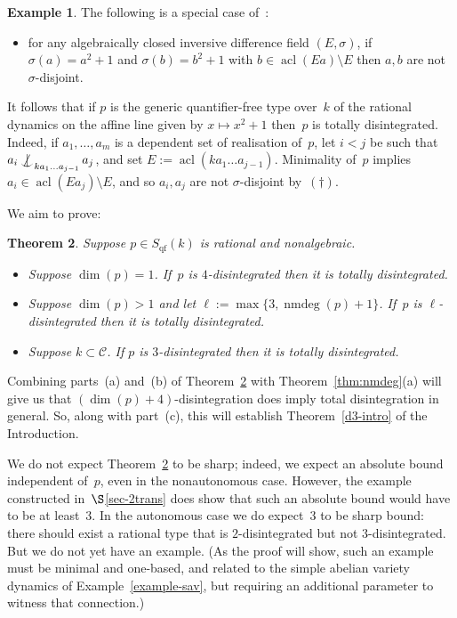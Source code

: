 \documentclass[\DocOpts]{amsart}
\newtheorem{theorem}{Theorem}[section]
\theoremstyle{definition}
\newtheorem{example}[theorem]{Example}
\def\qf{\operatorname{qf}}
\def\acl{\operatorname{acl}}
\def\nmdeg{\operatorname{nmdeg}}
\def\C{\mathcal{C}}
\newcommand{\<}{\langle}
\renewcommand{\>}{\rangle}
\def\notind#1#2{#1\setbox0=\hbox{\(#1x\)}\kern\wd0\hbox to 
0pt{\mathchardef\nn=12854\hss\(#1\nn\)\kern1.4\wd0\hss}\hbox to 
0pt{\hss\(#1\mid\)\hss}\lower.9\ht0 \hbox to 
0pt{\hss\(#1\smile\)\hss}\kern\wd0}
\def\nind{\mathop{\mathpalette\notind{}}}
\begin{document}
\begin{example}
The following is a special case of~\cite[Lemma~6.1]{acfa}:
\begin{itemize}
\item[$(\dagger)$]
for any algebraically closed inversive difference field $(E,\sigma)$, 
if $\sigma(a)=a^2+1$ and $\sigma(b)=b^2+1$ with $b\in\acl(Ea)\setminus E$ then $a,b$ are not $\sigma$-disjoint.
\end{itemize}
It follows that if $p$ is the generic quantifier-free type over~$k$ of the rational dynamics on the affine line given by 
$x\mapsto x^2+1$ then~$p$ is totally disintegrated.
Indeed, if $a_1,\dots,a_m$ is a dependent set of realisation of~$p$, let $i<j$ be such that $a_i\nind_{ka_1\dots a_{j-1}}a_j$, and set $E:=\acl(ka_1\dots a_{j-1})$.
Minimality of~$p$ implies  $a_i\in\acl(Ea_j)\setminus E$, and so $a_i,a_{j}$ are not $\sigma$-disjoint by~$(\dagger)$.
\end{example}

We aim to prove:

\begin{theorem}\label{d3}
Suppose $p\in S_{\qf}(k)$ is rational and nonalgebraic.
\begin{itemize}
\item[(a)]
Suppose $\dim(p)=1$.
If~$p$ is $4$-disintegrated then it is totally disintegrated.
\item[(b)]
 Suppose $\dim(p)>1$ and let
$\ell:=\max\{3, \nmdeg(p)+1\}$.
If~$p$ is $\ell$-disintegrated then it is totally disintegrated.
\item[(c)]
Suppose $k\subset\C$.
If $p$ is $3$-disintegrated then it is totally disintegrated.
\end{itemize}
\end{theorem}

Combining parts~(a) and~(b) of Theorem~\ref{d3} with Theorem~\ref{thm:nmdeg}(a) will give us that $(\dim(p)+4)$-disintegration does imply total disintegration in general.
So, along with part~(c), this will establish Theorem~\ref{d3-intro} of the Introduction.

We do not expect Theorem~\ref{d3} to be sharp; indeed, we expect an absolute bound independent of~$p$, even in the nonautonomous case.
However, the example constructed in~$\S$\ref{sec-2trans} does show that such an absolute bound would have to be at least~$3$.
In the autonomous case we do expect~$3$ to be sharp bound: there should exist a rational type that is $2$-disintegrated but not $3$-disintegrated.
But we do not yet have an example.
(As the proof will show, such an example must be minimal and one-based, and related to the simple abelian variety dynamics of Example~\ref{example-sav}, but requiring an additional parameter to witness that connection.)
\end{document}

